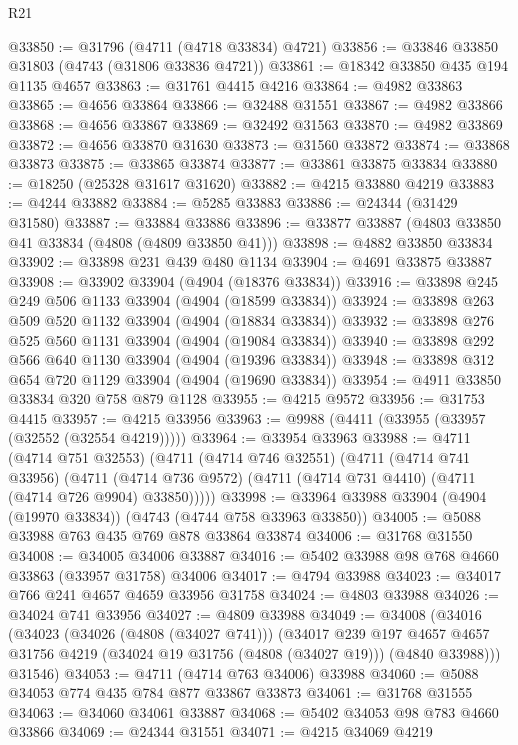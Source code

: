\begin{lexlean}{R21}
\begin{coremodule}
@33850 := @31796 (@4711 (@4718 @33834) @4721)
@33856 := @33846 @33850 @31803 (@4743 (@31806 @33836 @4721))
@33861 := @18342 @33850 @435 @194 @1135 @4657
@33863 := @31761 @4415 @4216
@33864 := @4982 @33863
@33865 := @4656 @33864
@33866 := @32488 @31551
@33867 := @4982 @33866
@33868 := @4656 @33867
@33869 := @32492 @31563
@33870 := @4982 @33869
@33872 := @4656 @33870 @31630
@33873 := @31560 @33872
@33874 := @33868 @33873
@33875 := @33865 @33874
@33877 := @33861 @33875 @33834
@33880 := @18250 (@25328 @31617 @31620)
@33882 := @4215 @33880 @4219
@33883 := @4244 @33882
@33884 := @5285 @33883
@33886 := @24344 (@31429 @31580)
@33887 := @33884 @33886
@33896 := @33877 @33887 (@4803 @33850 @41 @33834 (@4808 (@4809 @33850 @41)))
@33898 := @4882 @33850 @33834
@33902 := @33898 @231 @439 @480 @1134
@33904 := @4691 @33875 @33887
@33908 := @33902 @33904 (@4904 (@18376 @33834))
@33916 := @33898 @245 @249 @506 @1133 @33904 (@4904 (@18599 @33834))
@33924 := @33898 @263 @509 @520 @1132 @33904 (@4904 (@18834 @33834))
@33932 := @33898 @276 @525 @560 @1131 @33904 (@4904 (@19084 @33834))
@33940 := @33898 @292 @566 @640 @1130 @33904 (@4904 (@19396 @33834))
@33948 := @33898 @312 @654 @720 @1129 @33904 (@4904 (@19690 @33834))
@33954 := @4911 @33850 @33834 @320 @758 @879 @1128
@33955 := @4215 @9572
@33956 := @31753 @4415
@33957 := @4215 @33956
@33963 := @9988 (@4411 (@33955 (@33957 (@32552 (@32554 @4219)))))
@33964 := @33954 @33963
@33988 := @4711
    (@4714 @751 @32553)
    (@4711
      (@4714 @746 @32551)
      (@4711
        (@4714 @741 @33956)
        (@4711 (@4714 @736 @9572) (@4711 (@4714 @731 @4410) (@4711 (@4714 @726 @9904) @33850)))))
@33998 := @33964 @33988 @33904 (@4904 (@19970 @33834)) (@4743 (@4744 @758 @33963 @33850))
@34005 := @5088 @33988 @763 @435 @769 @878 @33864 @33874
@34006 := @31768 @31550
@34008 := @34005 @34006 @33887
@34016 := @5402 @33988 @98 @768 @4660 @33863 (@33957 @31758) @34006
@34017 := @4794 @33988
@34023 := @34017 @766 @241 @4657 @4659 @33956 @31758
@34024 := @4803 @33988
@34026 := @34024 @741 @33956
@34027 := @4809 @33988
@34049 := @34008
    (@34016
      (@34023
        (@34026 (@4808 (@34027 @741)))
        (@34017
          @239
          @197
          @4657
          @4657
          @31756
          @4219
          (@34024 @19 @31756 (@4808 (@34027 @19)))
          (@4840 @33988)))
      @31546)
@34053 := @4711 (@4714 @763 @34006) @33988
@34060 := @5088 @34053 @774 @435 @784 @877 @33867 @33873
@34061 := @31768 @31555
@34063 := @34060 @34061 @33887
@34068 := @5402 @34053 @98 @783 @4660 @33866
@34069 := @24344 @31551
@34071 := @4215 @34069 @4219

\end{coremodule}
\end{lexlean}
